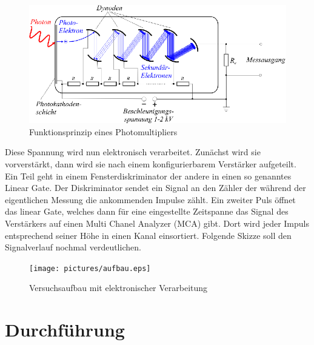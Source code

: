 \documentclass[12pt]{article}
\begin{document}
\begin{figure}[H]
 \includegraphics[width=0.9\linewidth]{pictures/photomultiplier_schema.eps}
 \caption{Funktionsprinzip eines Photomultipliers}
\end{figure}

Diese Spannung wird nun elektronisch verarbeitet. Zunächst wird sie vorverstärkt, dann wird sie nach einem konfigurierbarem Verstärker aufgeteilt. Ein Teil geht in einem Fensterdiskriminator der andere in einen so genanntes Linear Gate. Der Diskriminator sendet ein Signal an den Zähler der während der eigentlichen Messung die ankommenden Impulse zählt. Ein zweiter Puls öffnet das linear Gate, welches dann für eine eingestellte Zeitspanne das Signal des Verstärkers auf einen Multi Chanel Analyzer (MCA) gibt. Dort wird jeder Impuls entsprechend seiner Höhe in einen Kanal einsortiert. Folgende Skizze soll 
den Signalverlauf nochmal verdeutlichen.
\begin{figure}[H]
 \texttt{[image: pictures/aufbau.eps]}
 \caption{Versuchsaufbau mit elektronischer Verarbeitung}
\end{figure}
\section{Durchführung}
\end{document}
